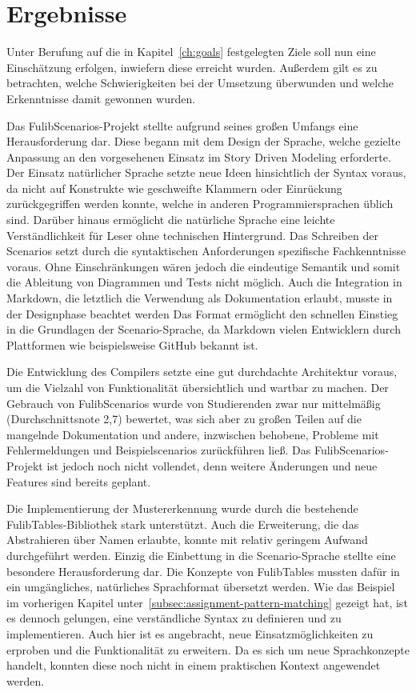 \chapter{Ergebnisse}\label{ch:ergebnisse}

Unter Berufung auf die in Kapitel~\ref{ch:goals} festgelegten Ziele soll nun eine Einschätzung erfolgen, inwiefern diese erreicht wurden.
Außerdem gilt es zu betrachten, welche Schwierigkeiten bei der Umsetzung überwunden und welche Erkenntnisse damit gewonnen wurden.

Das FulibScenarios-Projekt stellte aufgrund seines großen Umfangs eine Herausforderung dar.
Diese begann mit dem Design der Sprache, welche gezielte Anpassung an den vorgesehenen Einsatz im Story Driven Modeling erforderte.
Der Einsatz natürlicher Sprache setzte neue Ideen hinsichtlich der Syntax voraus, da nicht auf Konstrukte wie geschweifte Klammern oder Einrückung zurückgegriffen werden konnte, welche in anderen Programmiersprachen üblich sind.
Darüber hinaus ermöglicht die natürliche Sprache eine leichte Verständlichkeit für Leser ohne technischen Hintergrund.
Das Schreiben der Scenarios setzt durch die syntaktischen Anforderungen spezifische Fachkenntnisse voraus.
Ohne Einschränkungen wären jedoch die eindeutige Semantik und somit die Ableitung von Diagrammen und Tests nicht möglich.
Auch die Integration in Markdown, die letztlich die Verwendung als Dokumentation erlaubt, musste in der Designphase beachtet werden
Das Format ermöglicht den schnellen Einstieg in die Grundlagen der Scenario-Sprache, da Markdown vielen Entwicklern durch Plattformen wie beispielsweise GitHub bekannt ist.

Die Entwicklung des Compilers setzte eine gut durchdachte Architektur voraus, um die Vielzahl von Funktionalität übersichtlich und wartbar zu machen.
Der Gebrauch von FulibScenarios wurde von Studierenden zwar nur mittelmäßig (Durchschnittsnote 2,7) bewertet, was sich aber zu großen Teilen auf die mangelnde Dokumentation und andere, inzwischen behobene, Probleme mit Fehlermeldungen und Beispielscenarios zurückführen ließ.
Das FulibScenarios-Projekt ist jedoch noch nicht vollendet, denn weitere Änderungen und neue Features sind bereits geplant.

Die Implementierung der Mustererkennung wurde durch die bestehende FulibTables-Bibliothek stark unterstützt.
Auch die Erweiterung, die das Abstrahieren über Namen erlaubte, konnte mit relativ geringem Aufwand durchgeführt werden.
Einzig die Einbettung in die Scenario-Sprache stellte eine besondere Herausforderung dar.
Die Konzepte von FulibTables mussten dafür in ein umgängliches, natürliches Sprachformat übersetzt werden.
Wie das Beispiel im vorherigen Kapitel unter~\ref{subsec:assignment-pattern-matching} gezeigt hat, ist es dennoch gelungen, eine verständliche Syntax zu definieren und zu implementieren.
Auch hier ist es angebracht, neue Einsatzmöglichkeiten zu erproben und die Funktionalität zu erweitern.
Da es sich um neue Sprachkonzepte handelt, konnten diese noch nicht in einem praktischen Kontext angewendet werden.

